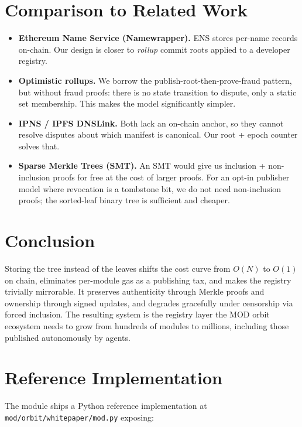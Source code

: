 \documentclass[11pt,a4paper]{article}
\begin{document}
\section{Comparison to Related Work}

\begin{itemize}
    \item \textbf{Ethereum Name Service (Namewrapper).} ENS stores per-name records on-chain. Our design is closer to \emph{rollup} commit roots applied to a developer registry.
    \item \textbf{Optimistic rollups.} We borrow the publish-root-then-prove-fraud pattern, but without fraud proofs: there is no state transition to dispute, only a static set membership. This makes the model significantly simpler.
    \item \textbf{IPNS / IPFS DNSLink.} Both lack an on-chain anchor, so they cannot resolve disputes about which manifest is canonical. Our root + epoch counter solves that.
    \item \textbf{Sparse Merkle Trees (SMT).} An SMT would give us inclusion + non-inclusion proofs for free at the cost of larger proofs. For an opt-in publisher model where revocation is a tombstone bit, we do not need non-inclusion proofs; the sorted-leaf binary tree is sufficient and cheaper.
\end{itemize}

\section{Conclusion}

Storing the tree instead of the leaves shifts the cost curve from $O(N)$ to $O(1)$ on chain, eliminates per-module gas as a publishing tax, and makes the registry trivially mirrorable. It preserves authenticity through Merkle proofs and ownership through signed updates, and degrades gracefully under censorship via forced inclusion. The resulting system is the registry layer the MOD orbit ecosystem needs to grow from hundreds of modules to millions, including those published autonomously by agents.

\appendix

\section{Reference Implementation}

The module ships a Python reference implementation at \texttt{mod/orbit/whitepaper/mod.py} exposing:
\end{document}
